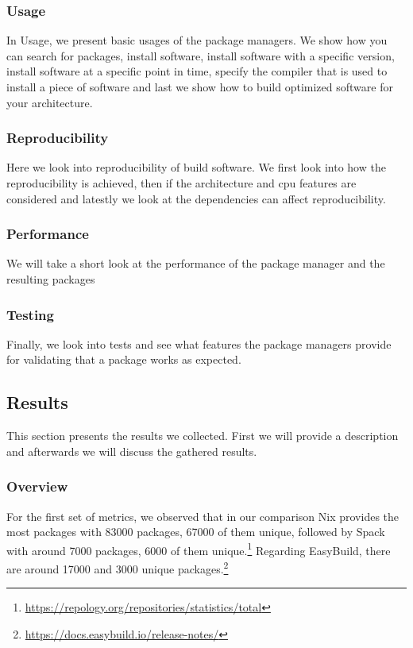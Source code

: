 \documentclass[conference,final,a4paper]{IEEEtran}
\begin{document}
\subsubsection{Usage}
In Usage, we present basic usages of the package managers.
We show how you can search for packages, install software, install software with a specific version, install software at a specific point in time, specify the compiler that is used to install a piece of software and last we show how to build optimized software for your architecture.\\

\subsubsection{Reproducibility}
Here we look into reproducibility of build software.
We first look into how the reproducibility is achieved, then if the architecture and cpu features are considered and latestly we look at the dependencies can affect reproducibility.\\

\subsubsection{Performance}
We will take a short look at the performance of the package manager and the resulting packages\\

\subsubsection{Testing}
Finally, we look into tests and see what features the package managers provide for validating that a package works as expected.

\subsection{Results}

This section presents the results we collected.
First we will provide a description and afterwards we will discuss the gathered results.\\

\subsubsection{Overview}

For the first set of metrics, we observed that in our comparison Nix provides the most packages with 83000 packages, 67000 of them unique, followed by Spack with around 7000 packages, 6000 of them unique.\footnote{\url{https://repology.org/repositories/statistics/total}}
Regarding EasyBuild, there are around 17000 and 3000 unique packages.\footnote{\url{https://docs.easybuild.io/release-notes/}}
\end{document}

